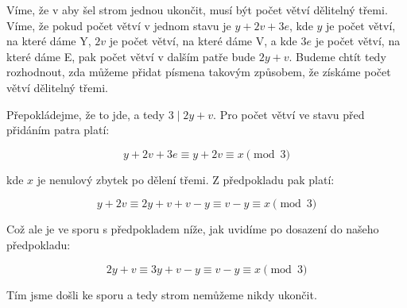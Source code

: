 \documentclass{fkssolpub}
\author{Ondřej Sedláček}
\begin{document}
Víme, že v aby šel strom jednou ukončit, musí být počet větví dělitelný třemi. Víme, že pokud počet větví v jednom stavu je $y + 2v + 3e$, kde $y$ je počet větví, na které dáme Y, $2v$ je počet větví, na které dáme V, a kde $3e$ je počet větví, na které dáme E, pak počet větví v dalším patře bude $2y + v$. Budeme chtít tedy rozhodnout, zda můžeme přidat písmena takovým způsobem, že získáme počet větví dělitelný třemi.

Přepokládejme, že to jde, a tedy $3 \mid 2y + v$. Pro počet větví ve stavu před přidáním patra platí:

\[
  y + 2v + 3e \equiv y + 2v \equiv x \pmod{3}
\]

kde $x$ je nenulový zbytek po dělení třemi. Z předpokladu pak platí:

\[
  y + 2v \equiv 2y + v + v - y \equiv v - y \equiv x \pmod{3}
\]

Což ale je ve sporu s předpokladem níže, jak uvidíme po dosazení do našeho předpokladu:

\[
  2y + v \equiv 3y + v - y \equiv v - y \equiv x \pmod{3}
\]

Tím jsme došli ke sporu a tedy strom nemůžeme nikdy ukončit.
\end{document}
